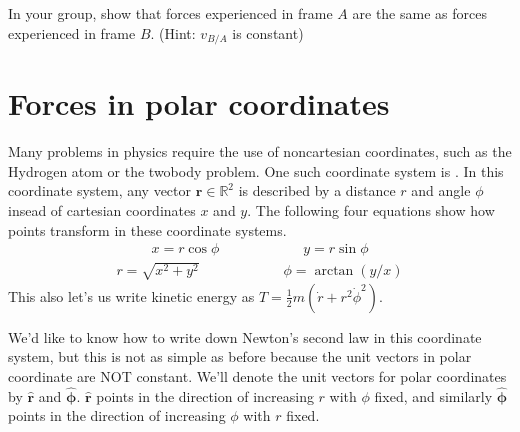 \documentclass[letterpaper,10pt,english]{jupyterBook}
\begin{document}
\sphinxAtStartPar
{}

\sphinxAtStartPar
In your group, show that forces experienced in frame \(A\) are the same as forces experienced in frame \(B\). (Hint: \(v_{B/A}\) is constant)


\section{Forces in polar coordinates}
\label{\detokenize{content/1_mechanics/frames:forces-in-polar-coordinates}}
\sphinxAtStartPar
Many problems in physics require the use of non\sphinxhyphen{}cartesian coordinates, such as the Hydrogen atom or the two\sphinxhyphen{}body problem. One such coordinate system is . In this coordinate system, any vector \(\mathbf{r}\in \mathbb{R}^2\) is described by a distance \(r\) and angle \(\phi\) insead of cartesian coordinates \(x\) and \(y\). The following four equations show how points transform in these coordinate systems.
\begin{equation*}
\begin{split}
x = r\cos \phi \hspace{1in} y = r\sin \phi
\end{split}
\end{equation*}\begin{equation*}
\begin{split}
r = \sqrt{x^2 + y^2} \hspace{1in} \phi = \arctan(y / x)
\end{split}
\end{equation*}
\sphinxAtStartPar
This also let’s us write kinetic energy as \(T = \frac{1}{2}m(\dot{r} + r^2\dot{\phi}^2)\).

\sphinxAtStartPar
We’d like to know how to write down Newton’s second law in this coordinate system, but this is not as simple as before because the unit vectors in polar coordinate are NOT constant. We’ll denote the unit vectors for polar coordinates by \(\hat{\mathbf{r}}\) and \(\hat{\boldsymbol{\phi}}\). \(\hat{\mathbf{r}}\) points in the direction of increasing \(r\) with \(\phi\) fixed, and similarly \(\hat{\boldsymbol{\phi}}\) points in the direction of increasing \(\phi\) with \(r\) fixed.
\end{document}
